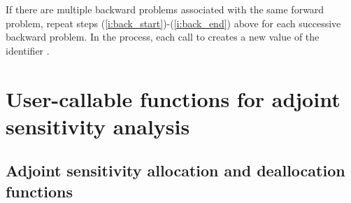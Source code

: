 If there are multiple backward problems associated with the same forward problem,
repeat steps (\ref{i:back_start})-(\ref{i:back_end}) above for each successive
backward problem.  In the process, each call to  creates a new
value of the identifier .

\section{User-callable functions for adjoint sensitivity analysis}

\subsection{Adjoint sensitivity allocation and deallocation functions}
\label{sss:cvadjinit}

